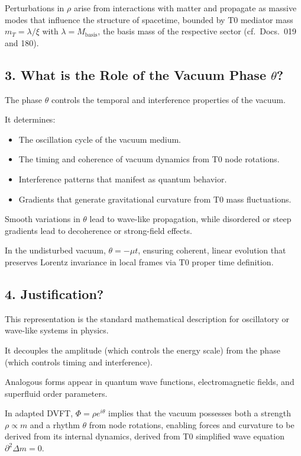 	Perturbations in $\rho$ arise from interactions with matter and propagate as massive modes that influence the structure of spacetime, bounded by T0 mediator mass $m_T = \lambda / \xi$ with $\lambda = M_\text{basis}$, the basis mass of the respective sector (cf.\ Docs.~019 and 180).
	
	\subsection{3. What is the Role of the Vacuum Phase $\theta$?}
	
	The phase $\theta$ controls the temporal and interference properties of the vacuum.
	
	It determines:
	\begin{itemize}
		\item The oscillation cycle of the vacuum medium.
		\item The timing and coherence of vacuum dynamics from T0 node rotations.
		\item Interference patterns that manifest as quantum behavior.
		\item Gradients that generate gravitational curvature from T0 mass fluctuations.
	\end{itemize}
	
	Smooth variations in $\theta$ lead to wave-like propagation, while disordered or steep gradients lead to decoherence or strong-field effects.
	
	In the undisturbed vacuum, $\theta = -\mu t$, ensuring coherent, linear evolution that preserves Lorentz invariance in local frames via T0 proper time definition.
	
	\subsection{4. Justification?}
	
	This representation is the standard mathematical description for oscillatory or wave-like systems in physics.
	
	It decouples the amplitude (which controls the energy scale) from the phase (which controls timing and interference).
	
	Analogous forms appear in quantum wave functions, electromagnetic fields, and superfluid order parameters.
	
	In adapted DVFT, $\Phi = \rho e^{i\theta}$ implies that the vacuum possesses both a strength $\rho \propto m$ and a rhythm $\theta$ from node rotations, enabling forces and curvature to be derived from its internal dynamics, derived from T0 simplified wave equation $\partial^2 \Delta m = 0$.
	
